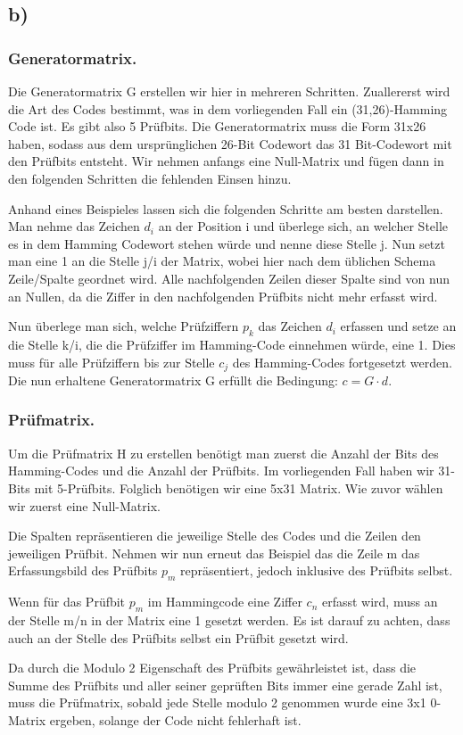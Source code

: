 \documentclass{article}
\begin{document}
	\subsection*{b)}
		\subsubsection*{Generatormatrix.}
		Die Generatormatrix G erstellen wir hier in mehreren Schritten. Zuallererst wird die Art des Codes bestimmt, was in dem vorliegenden Fall ein (31,26)-Hamming Code ist. Es gibt also 5 Prüfbits. Die Generatormatrix muss die Form 31x26 haben, sodass aus dem ursprünglichen 26-Bit Codewort das 31 Bit-Codewort mit den Prüfbits entsteht. Wir nehmen anfangs eine Null-Matrix und fügen dann in den folgenden Schritten die fehlenden Einsen hinzu.

		Anhand eines Beispieles lassen sich die folgenden Schritte am besten darstellen. Man nehme das Zeichen $d_i$ an der Position i und überlege sich, an welcher Stelle es in dem Hamming Codewort stehen würde und nenne diese Stelle j. Nun setzt man eine 1 an die Stelle j/i der Matrix, wobei hier nach dem üblichen Schema Zeile/Spalte geordnet wird. Alle nachfolgenden Zeilen dieser Spalte sind von nun an Nullen, da die Ziffer in den nachfolgenden Prüfbits nicht mehr erfasst wird.

		Nun überlege man sich, welche Prüfziffern $p_k$ das Zeichen $d_i$ erfassen und setze an die Stelle k/i, die die Prüfziffer im Hamming-Code einnehmen würde, eine 1. Dies muss für alle Prüfziffern bis zur Stelle $c_j$ des Hamming-Codes fortgesetzt werden. Die nun erhaltene Generatormatrix G erfüllt die Bedingung: $c=G \cdot d$.

		\subsubsection*{Prüfmatrix.}

		Um die Prüfmatrix H zu erstellen benötigt man zuerst die Anzahl der Bits des Hamming-Codes und die Anzahl der Prüfbits. Im vorliegenden Fall haben wir 31-Bits mit 5-Prüfbits. Folglich benötigen wir eine 5x31 Matrix. Wie zuvor wählen wir zuerst eine Null-Matrix.

		Die Spalten repräsentieren die jeweilige Stelle des Codes und die Zeilen den jeweiligen Prüfbit. Nehmen wir nun erneut das Beispiel das die Zeile m das Erfassungsbild des Prüfbits $p_m$ repräsentiert, jedoch inklusive des Prüfbits selbst.

		Wenn für das Prüfbit $p_m$ im Hammingcode eine Ziffer $c_n$ erfasst wird, muss an der Stelle m/n in der Matrix eine 1 gesetzt werden. Es ist darauf zu achten, dass auch an der Stelle des Prüfbits selbst ein Prüfbit gesetzt wird.

		Da durch die Modulo 2 Eigenschaft des Prüfbits gewährleistet ist, dass die Summe des Prüfbits und aller seiner geprüften Bits immer eine gerade Zahl ist, muss die Prüfmatrix, sobald jede Stelle modulo 2 genommen wurde eine 3x1 0-Matrix ergeben, solange der Code nicht fehlerhaft ist. 
\end{document}
